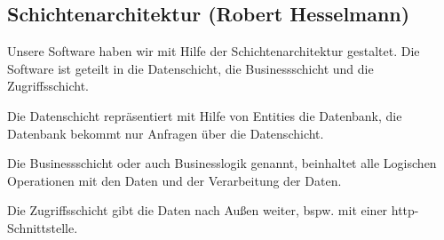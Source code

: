 \subsection*{Schichtenarchitektur (Robert Hesselmann)}

Unsere Software haben wir mit Hilfe der Schichtenarchitektur gestaltet. Die Software ist geteilt in die Datenschicht, die Businessschicht und die Zugriffsschicht.

Die Datenschicht repräsentiert mit Hilfe von Entities die Datenbank, die Datenbank bekommt nur Anfragen über die Datenschicht.

Die Businessschicht oder auch Businesslogik genannt, beinhaltet alle Logischen Operationen mit den Daten und der Verarbeitung der Daten.

Die Zugriffsschicht gibt die Daten nach Außen weiter, bspw. mit einer \gls{http}-Schnittstelle.